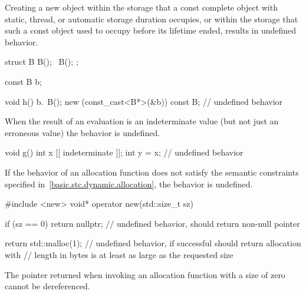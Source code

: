 
\pnum
Creating a new object within the storage that a const complete object
with static, thread, or automatic storage duration occupies,
or within the storage that such a const object used to occupy
before its lifetime ended, results in undefined behavior.

\pnum
\begin{example}
\begin{codeblock}
struct B {
  B();
  ~B();
};

const B b;

void h() {
  b.~B();
  new (const_cast<B*>(&b)) const B; // undefined behavior
}
\end{codeblock}
\end{example}


\pnum
When the result of an evaluation is an indeterminate value
(but not just an erroneous value) the behavior is undefined.

\pnum
\begin{example}
\begin{codeblock}
void g() {
  int x [[ indeterminate ]];
  int y = x;    // undefined behavior
}
\end{codeblock}
\end{example}

\pnum
If the behavior of an allocation function
does not satisfy the semantic constraints specified
in~\ref{basic.stc.dynamic.allocation},
the behavior is undefined.

\pnum
\begin{example}
\begin{codeblock}
#include <new>
void* operator new(std::size_t sz) {
  if (sz == 0)
    return nullptr;             // undefined behavior, should return non-null pointer

  return std::malloc(1);        // undefined behavior, if successful should return allocation with
                                // length in bytes is at least as large as the requested size
}
\end{codeblock}
\end{example}


\pnum
The pointer returned when invoking an allocation function with a size of zero
cannot be dereferenced.

